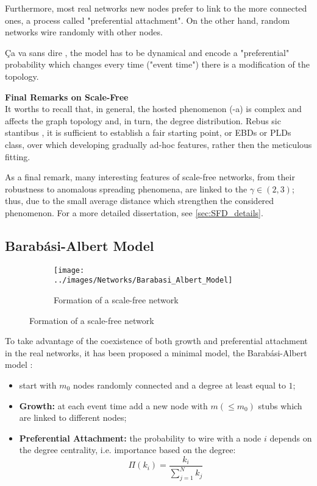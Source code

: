 \documentclass[a4paper,12pt,twoside]{book} %
\theoremstyle{definition}
\begin{document}
Furthermore, most real networks new nodes prefer to link to the more connected ones, a process called "preferential attachment". On the other hand, random networks wire randomly with other nodes.

Ça va sans dire \label{cit:A.Marzo}, the model has to be dynamical and encode a "preferential" probability which changes every time ("event time") there is a modification of the topology. 

{\large \textbf{Final Remarks on Scale-Free}} \\
It worths to recall that, in general, the hosted phenomenon (-a) is complex and affects the graph topology and, in turn, the degree distribution. Rebus sic stantibus \label{cit:D.Massa}, it is sufficient to establish a fair starting point, or EBDs or PLDs class, over which developing gradually ad-hoc features, rather then the meticulous fitting.

As a final remark, many interesting features of scale-free networks, from their robustness to anomalous spreading phenomena, are linked to the $\gamma \in (2,3)$; thus, due to the small average distance which strengthen the considered phenomenon.
For a more detailed dissertation, see \autoref{sec:SFD_details}.

\newpage
\subsection{Barabási-Albert Model}
\begin{figure}[ht]
    \begin{subfigure}{\textwidth}
        \texttt{[image: ../images/Networks/Barabasi\_Albert\_Model]}
        \centering
        \caption{Formation of a scale-free network \cite{Barabasi:2009_SF_DecadeBeyond}}
        \label{fig:LCD_growth}
    \end{subfigure}
\end{figure}

To take advantage of the coexistence of both growth and preferential attachment in the real networks, it has been proposed a minimal model, the Barabási-Albert model \cite{barabasi::2016networkbook}:
\begin{itemize}
	\item start with $m_0$ nodes randomly connected and a degree at least equal to $1$;
	\item \textbf{Growth:} at each event time add a new node with $m(\leq  m_0)$ stubs which are linked to different nodes;
	\item \textbf{Preferential Attachment:} the probability to wire with a node $i$ depends on the degree centrality, i.e. importance based on the degree:
	\begin{equation}
		\Pi(k_i) = \frac{k_i}{\sum_{j = 1}^N k_j}
	\end{equation}
\end{itemize}
\end{document}
